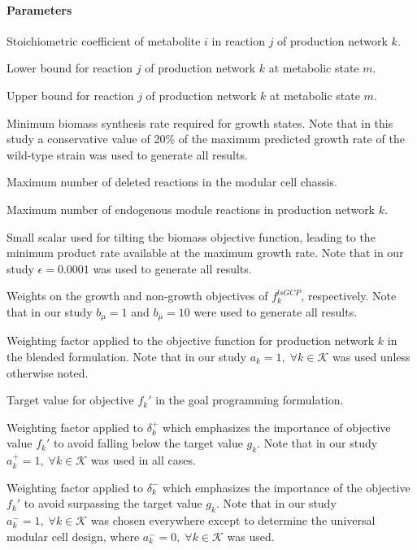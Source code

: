\paragraph{Parameters}
\begin{description}[leftmargin=1.6cm, style=nextline, itemindent=-10pt]
\item[$S_{ijk}$] Stoichiometric coefficient of metabolite $i$ in reaction $j$ of production network $k$.
\item[$l_{jkm}$] Lower bound for reaction $j$ of production network $k$ at metabolic state $m$.
\item[$u_{jkm}$] Upper bound for reaction $j$ of production network $k$ at metabolic state $m$.
\item[$\gamma$] Minimum biomass synthesis rate required for growth states. Note that in this study a conservative value of 20\% of the maximum predicted growth rate of the wild-type strain was used to generate all results.
\item[$\alpha$] Maximum number of deleted reactions in the modular cell chassis.
\item[$\beta_k$] Maximum number of endogenous module reactions in production network $k$.
\item[$\epsilon$] Small scalar used for tilting the biomass objective function, leading to the minimum product rate available at the maximum growth rate. Note that in our study $\epsilon=0.0001$ was used to generate all results.
\item[$b_{\mu}$, $b_{\bar{\mu}}$] Weights on the growth  and non-growth objectives of $f_k^{lsGCP}$, respectively. Note that in our study  $b_{\mu}=1$ and $b_{\bar{\mu}}=10$ were used to generate all results.
\item[$a_k$] Weighting factor applied to the objective function for production network $k$ in the  blended formulation. Note that in our study $a_k =1, \; \forall k \in \mathcal{K}$ was used unless otherwise noted.
\item[$g_k$] Target value for objective $f_k'$ in the goal programming formulation.
\item[$a_k^+$] Weighting factor applied to $\delta_k^+$ which emphasizes the importance of objective value $f_k'$ to avoid falling below the target value $g_k$. Note that in our study $a_k^+ = 1, \; \forall k \in \mathcal{K}$ was used in all cases.
\item[$a_k^-$] Weighting factor applied to $\delta_k^-$ which emphasizes the importance of the objective $f_k'$ to avoid surpassing the target value $g_k$. Note that in our study $a_k^- = 1, \; \forall k \in \mathcal{K}$ was chosen everywhere except to determine the universal modular cell design, where $a_k^- = 0, \; \forall k \in \mathcal{K}$ was used.

\end{description}
